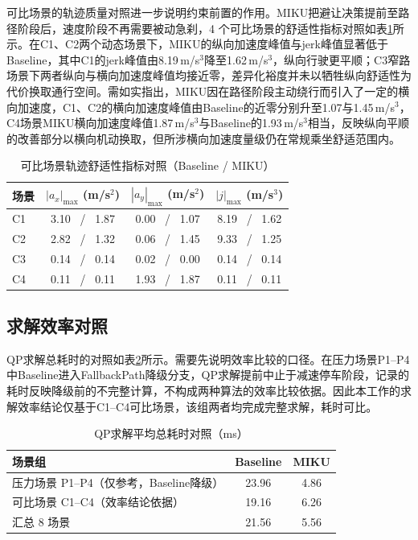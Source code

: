\documentclass[a4paper,11pt]{ctexart}
\theoremstyle{definition}
\begin{document}
可比场景的轨迹质量对照进一步说明约束前置的作用。MIKU把避让决策提前至路径阶段后，速度阶段不再需要被动急刹，4 个可比场景的舒适性指标对照如表\ref{tab:exp_comfort}所示。在C1、C2两个动态场景下，MIKU的纵向加速度峰值与jerk峰值显著低于Baseline，其中C1的jerk峰值由8.19\,m/s$^3$降至1.62\,m/s$^3$，纵向行驶更平顺；C3窄路场景下两者纵向与横向加速度峰值均接近零，差异化裕度并未以牺牲纵向舒适性为代价换取通行空间。需如实指出，MIKU因在路径阶段主动绕行而引入了一定的横向加速度，C1、C2的横向加速度峰值由Baseline的近零分别升至1.07与1.45\,m/s$^3$，C4场景MIKU横向加速度峰值1.87\,m/s$^3$与Baseline的1.93\,m/s$^3$相当，反映纵向平顺的改善部分以横向机动换取，但所涉横向加速度量级仍在常规乘坐舒适范围内。

\begin{table}[htbp]
\centering
\caption{可比场景轨迹舒适性指标对照（Baseline / MIKU）}
\label{tab:exp_comfort}
\small
\begin{tabular}{lccc}
\toprule
\textbf{场景} & \textbf{$|a_x|_{\max}$ (m/s$^2$)} & \textbf{$|a_y|_{\max}$ (m/s$^2$)} & \textbf{$|j|_{\max}$ (m/s$^3$)} \\
\midrule
C1 & 3.10 \ / \ 1.87 & 0.00 \ / \ 1.07 & 8.19 \ / \ 1.62 \\
C2 & 2.82 \ / \ 1.32 & 0.06 \ / \ 1.45 & 9.33 \ / \ 1.25 \\
C3 & 0.14 \ / \ 0.14 & 0.02 \ / \ 0.00 & 0.14 \ / \ 0.14 \\
C4 & 0.11 \ / \ 0.11 & 1.93 \ / \ 1.87 & 0.11 \ / \ 0.11 \\
\bottomrule
\end{tabular}
\end{table}

\subsection{求解效率对照}
\label{subsec:exp_qp}

QP求解总耗时的对照如表\ref{tab:exp_qp}所示。需要先说明效率比较的口径。在压力场景P1--P4中Baseline进入FallbackPath降级分支，QP求解提前中止于减速停车阶段，记录的耗时反映降级前的不完整计算，不构成两种算法的效率比较依据。因此本工作的求解效率结论仅基于C1--C4可比场景，该组两者均完成完整求解，耗时可比。

\begin{table}[htbp]
\centering
\caption{QP求解平均总耗时对照（ms）}
\label{tab:exp_qp}
\small
\begin{tabular}{lcc}
\toprule
\textbf{场景组} & \textbf{Baseline} & \textbf{MIKU} \\
\midrule
压力场景 P1--P4（仅参考，Baseline降级） & 23.96 & 4.86 \\
可比场景 C1--C4（效率结论依据） & 19.16 & 6.26 \\
\midrule
汇总 8 场景 & 21.56 & 5.56 \\
\bottomrule
\end{tabular}
\end{table}
\end{document}

